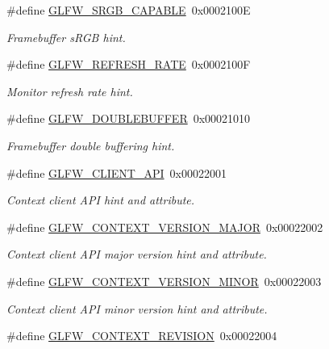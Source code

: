 \begin{DoxyCompactItemize}
\#define \mbox{\hyperlink{group__window_ga444a8f00414a63220591f9fdb7b5642b}{G\+L\+F\+W\+\_\+\+S\+R\+G\+B\+\_\+\+C\+A\+P\+A\+B\+LE}}~0x0002100E
\begin{DoxyCompactList}\small\item\em Framebuffer s\+R\+GB hint. \end{DoxyCompactList}\item 
\#define \mbox{\hyperlink{group__window_ga0f20825e6e47ee8ba389024519682212}{G\+L\+F\+W\+\_\+\+R\+E\+F\+R\+E\+S\+H\+\_\+\+R\+A\+TE}}~0x0002100F
\begin{DoxyCompactList}\small\item\em Monitor refresh rate hint. \end{DoxyCompactList}\item 
\#define \mbox{\hyperlink{group__window_ga714a5d569e8a274ea58fdfa020955339}{G\+L\+F\+W\+\_\+\+D\+O\+U\+B\+L\+E\+B\+U\+F\+F\+ER}}~0x00021010
\begin{DoxyCompactList}\small\item\em Framebuffer double buffering hint. \end{DoxyCompactList}\item 
\#define \mbox{\hyperlink{group__window_ga649309cf72a3d3de5b1348ca7936c95b}{G\+L\+F\+W\+\_\+\+C\+L\+I\+E\+N\+T\+\_\+\+A\+PI}}~0x00022001
\begin{DoxyCompactList}\small\item\em Context client A\+PI hint and attribute. \end{DoxyCompactList}\item 
\#define \mbox{\hyperlink{group__window_gafe5e4922de1f9932d7e9849bb053b0c0}{G\+L\+F\+W\+\_\+\+C\+O\+N\+T\+E\+X\+T\+\_\+\+V\+E\+R\+S\+I\+O\+N\+\_\+\+M\+A\+J\+OR}}~0x00022002
\begin{DoxyCompactList}\small\item\em Context client A\+PI major version hint and attribute. \end{DoxyCompactList}\item 
\#define \mbox{\hyperlink{group__window_ga31aca791e4b538c4e4a771eb95cc2d07}{G\+L\+F\+W\+\_\+\+C\+O\+N\+T\+E\+X\+T\+\_\+\+V\+E\+R\+S\+I\+O\+N\+\_\+\+M\+I\+N\+OR}}~0x00022003
\begin{DoxyCompactList}\small\item\em Context client A\+PI minor version hint and attribute. \end{DoxyCompactList}\item 
\#define \mbox{\hyperlink{group__window_gafb9475071aa77c6fb05ca5a5c8678a08}{G\+L\+F\+W\+\_\+\+C\+O\+N\+T\+E\+X\+T\+\_\+\+R\+E\+V\+I\+S\+I\+ON}}~0x00022004

\end{DoxyCompactItemize}
